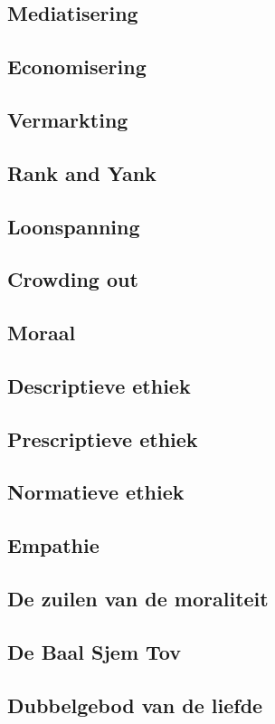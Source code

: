 \documentclass[main.tex]{subfiles}
\begin{document}
\subsection*{Mediatisering}
\subsection*{Economisering}
\subsection*{Vermarkting}
\subsection*{Rank and Yank}
\subsection*{Loonspanning}
\subsection*{Crowding out}
\subsection*{Moraal}
\subsection*{Descriptieve ethiek}
\subsection*{Prescriptieve ethiek}
\subsection*{Normatieve ethiek}
\subsection*{Empathie}
\subsection*{De zuilen van de moraliteit}
\subsection*{De Baal Sjem Tov}
\subsection*{Dubbelgebod van de liefde}
\end{document}
